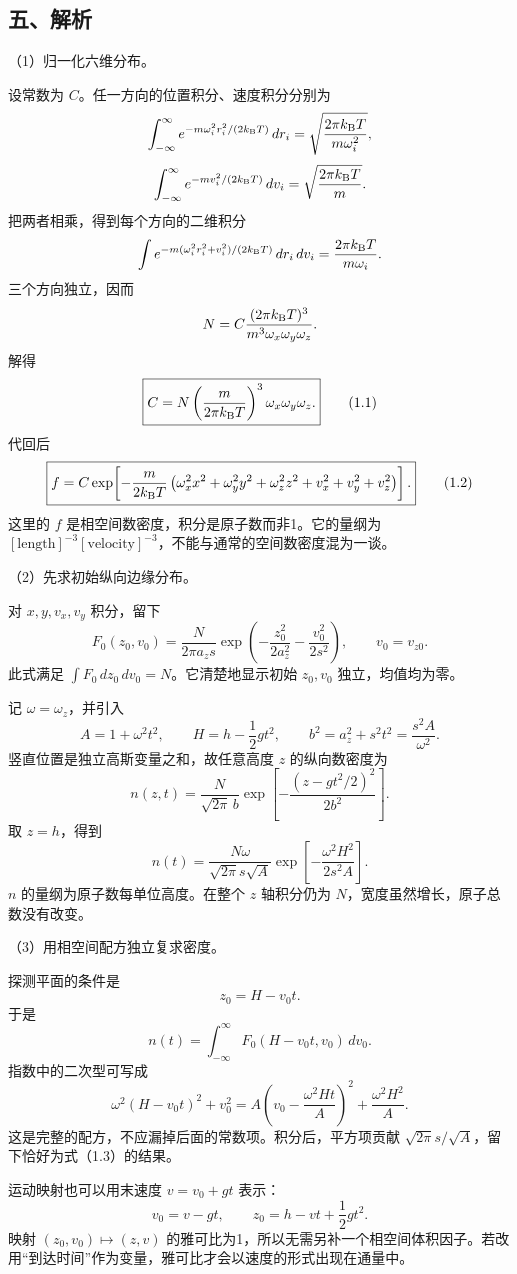 \documentclass[12pt,a4paper,fontset=fandol]{ctexart}
\begin{document}
\subsection{五、解析}\label{ux4e94ux89e3ux6790}

（1）归一化六维分布。

设常数为 \(C\)。任一方向的位置积分、速度积分分别为 \[
\int_{-\infty}^{\infty}
e^{-m\omega_i^2r_i^2/(2k_{\rm B}T)}\,dr_i
=\sqrt{\frac{2\pi k_{\rm B}T}{m\omega_i^2}},
\] \[
\int_{-\infty}^{\infty}
e^{-mv_i^2/(2k_{\rm B}T)}\,dv_i
=\sqrt{\frac{2\pi k_{\rm B}T}{m}}.
\] 把两者相乘，得到每个方向的二维积分 \[
\int e^{-m(\omega_i^2r_i^2+v_i^2)/(2k_{\rm B}T)}
\,dr_i\,dv_i=\frac{2\pi k_{\rm B}T}{m\omega_i}.
\] 三个方向独立，因而 \[
N=C\frac{(2\pi k_{\rm B}T)^3}{m^3\omega_x\omega_y\omega_z}.
\] 解得 \[
\boxed{C=N\left(\frac{m}{2\pi k_{\rm B}T}\right)^3
\omega_x\omega_y\omega_z.}\tag{1.1}
\] 代回后 \[
\boxed{
f=C\exp\!\left[
-\frac{m}{2k_{\rm B}T}
\left(\omega_x^2x^2+\omega_y^2y^2+\omega_z^2z^2
+v_x^2+v_y^2+v_z^2\right)\right].}\tag{1.2}
\] 这里的 \(f\) 是相空间数密度，积分是原子数而非1。它的量纲为
\([\mathrm{length}]^{-3}[\mathrm{velocity}]^{-3}\)，不能与通常的空间数密度混为一谈。

（2）先求初始纵向边缘分布。

对 \(x,y,v_x,v_y\) 积分，留下 \[
F_0(z_0,v_0)
=\frac{N}{2\pi a_zs}
\exp\!\left(-\frac{z_0^2}{2a_z^2}
-\frac{v_0^2}{2s^2}\right),\qquad v_0=v_{z0}.
\] 此式满足 \(\int F_0\,dz_0\,dv_0=N\)。它清楚地显示初始 \(z_0,v_0\)
独立，均值均为零。

记 \(\omega=\omega_z\)，并引入 \[
A=1+\omega^2t^2,\qquad
H=h-\frac12gt^2,\qquad
b^2=a_z^2+s^2t^2=\frac{s^2A}{\omega^2}.
\] 竖直位置是独立高斯变量之和，故任意高度 \(z\) 的纵向数密度为 \[
n(z,t)=\frac{N}{\sqrt{2\pi}\,b}
\exp\!\left[-\frac{(z-gt^2/2)^2}{2b^2}\right].
\] 取 \(z=h\)，得到 \[
\boxed{
n(t)=\frac{N\omega}{\sqrt{2\pi}s\sqrt A}
\exp\!\left[-\frac{\omega^2H^2}{2s^2A}\right].}\tag{1.3}
\] \(n\) 的量纲为原子数每单位高度。在整个 \(z\) 轴积分仍为
\(N\)，宽度虽然增长，原子总数没有改变。

（3）用相空间配方独立复求密度。

探测平面的条件是 \[
z_0=H-v_0t.
\] 于是 \[
n(t)=\int_{-\infty}^{\infty}F_0(H-v_0t,v_0)\,dv_0.
\] 指数中的二次型可写成 \[
\omega^2(H-v_0t)^2+v_0^2
=A\left(v_0-\frac{\omega^2Ht}{A}\right)^2
+\frac{\omega^2H^2}{A}.
\] 这是完整的配方，不应漏掉后面的常数项。积分后，平方项贡献
\(\sqrt{2\pi}s/\sqrt A\)，留下恰好为式（1.3）的结果。

运动映射也可以用末速度 \(v=v_0+gt\) 表示： \[
v_0=v-gt,\qquad
z_0=h-vt+\frac12gt^2.
\] 映射 \((z_0,v_0)\mapsto(z,v)\)
的雅可比为1，所以无需另补一个相空间体积因子。若改用``到达时间''作为变量，雅可比才会以速度的形式出现在通量中。
\end{document}
